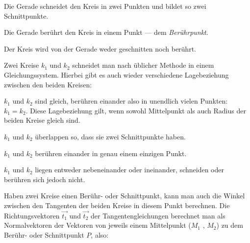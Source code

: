 \begin{enumerate}

\renewcommand{\theenumi}{\Alph{enumi}}


	Die Gerade schneidet den Kreis in zwei Punkten und bildet so zwei Schnittpunkte.


	Die Gerade ber\"{u}hrt den Kreis in einem Punkt --- dem \emph{Ber\"{u}hrpunkt}.


	Der Kreis wird von der Gerade weder geschnitten noch ber\"{u}hrt. 

\end{enumerate}


Zwei Kreise $k_{1}$ und $k_{2}$ schneidet man nach \"{u}blicher Methode in einem Gleichungssystem. Hierbei gibt es auch wieder verschiedene Lagebeziehung zwischen den beiden Kreisen:
\begin{enumerate}

\renewcommand{\theenumi}{\Alph{enumi}}


	$k_{1}$ und $k_{2}$ sind gleich, ber\"{u}hren einander also in unendlich vielen Punkten: $k_{1} = k_{2}$. Diese Lagebeziehung gilt, wenn sowohl Mittelpunkt als auch Radius der beiden Kreise gleich sind. 


	$k_{1}$ und $k_{2}$ \"{u}berlappen so, dass sie zwei Schnittpunkte haben.


	$k_{1}$ und $k_{2}$ ber\"{u}hren einander in genau einem einzigen Punkt.


	$k_{1}$ und $k_{2}$ liegen entweder nebeneinander oder ineinander, schneiden oder ber\"{u}hren sich jedoch nicht. 

\end{enumerate}

Haben zwei Kreise einen Ber\"{u}hr- oder Schnittpunkt, kann man auch die Winkel zwischen den Tangenten der beiden Kreise in diesem Punkt berechnen. Die Richtungsvektoren $\vec{t_{1}}$ und $\vec{t_{2}}$ der Tangentengleichungen berechnet man als Normalvektoren der Vektoren von jeweils einem Mittelpunkt ($M_{1}$ , $M_{2}$) zu dem Ber\"{u}hr- oder Schnittpunkt $P$, also:

